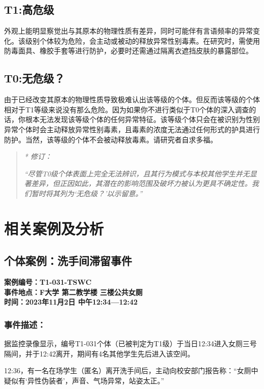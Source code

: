 \documentclass[]{ctexrep}
\begin{document}
	\section{T1:高危级}
	外观上能明显察觉出与其原本的物理性质有差异，同时可能伴有言语频率的异常变化。该级别个体较为危险，会主动或被动的释放异常性别毒素。在研究时，需使用防毒面具、橡胶手套等进行防护，必要时还需通过隔离衣遮挡皮肤的暴露部位。
	
	\section{T0:无危级？}
	由于已经改变其原本的物理性质导致极难认出该等级的个体。但反而该等级的个体相对于T1等级来说没有那么危险。因为如果你不进行类似于T0个体的深入调查的话，你根本无法发现该等级个体的任何异常特征。该等级个体只会在被识别为性别异常个体时会主动释放异常性别毒素，且毒素的浓度无法通过任何形式的护具进行防护。当然，该等级的个体不会被动释放毒素。请研究者自求多福。
	
	\begin{quotation}
		\textit{\hspace{-4em} * 修订：}
		
		\textit{“尽管T0级个体表面上完全无法辨识，且其行为模式与本校其他学生并无显著差异，但正因如此，其潜在的影响范围及破坏力被认为更具不确定性。我们暂时将其列为‘无危级？’以示留意。”}
	\end{quotation}
	
	\chapter{相关案例及分析}
	\section{个体案例：洗手间滞留事件}
	\begin{center}
	\textbf{案例编号：T1-031-TSWC\\
	事件地点：F大学 第二教学楼 三楼公共女厕\\
	时间：2023年11月2日 中午12:34—12:42\\}
	\end{center}
	\subsection{事件描述：}
	据监控录像显示，编号T1-031个体（已被判定为T1级）于当日12:34进入女厕三号隔间，并于12:42离开，期间有4名其他学生先后进入该空间。
	
	12:36，有一名在场学生（匿名）离开洗手间后，主动向校安部门报告称：“女厕中疑似有‘异性伪装者’，声音、气场异常，站姿太正。”
	
\end{document}
